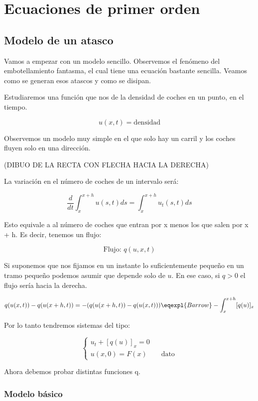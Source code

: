 \chapter{Ecuaciones de primer orden}

\section{Modelo de un atasco}

	Vamos a empezar con un modelo sencillo. Observemos el fenómeno del embotellamiento fantasma, el cual tiene una ecuación bastante sencilla. Veamos como se generan esos atascos y como se disipan.

	Estudiaremos una función que nos de la densidad de coches en un punto, en el tiempo.

	$$u(x,t) = \text{densidad}$$

	Observemos un modelo muy simple en el que solo hay un carril y los coches fluyen solo en una dirección.

	(DIBUO DE LA RECTA CON FLECHA HACIA LA DERECHA)

	La variación en el número de coches de un intervalo será:

	$$ \frac{d}{dt} \int^{x+h}_{x} u(s,t) ds = \int^{x+h}_{x} u_t(s,t) ds $$

	Esto equivale a al número de coches que entran por x menos los que salen por x + h. Es decir, tenemos un flujo:

	$$\text{Flujo: } q(u, x, t)$$

	Si suponemos que nos fijamos en un instante lo suficientemente pequeño en un tramo pequeño podemos asumir que depende solo de $u$. En ese caso, si $q > 0$ el flujo sería hacia la derecha.

	$$ q(u(x,t)) - q(u(x+h,t)) = -( q(u(x+h,t)) -  q(u(x,t)) ) \eqexpl{Barrow} -\int^{x+h}_{x} [q(u)]_{x} $$

	Por lo tanto tendremos sistemas del tipo:

	\begin{equation*}
	\left\{
	\begin{array}{l}
	u_t + [q(u)]_{x} = 0 \\
	u(x, 0) = F(x) \quad \quad \text{dato}
	\end{array}
	\right.
	\end{equation*}

	Ahora debemos probar distintas funciones q.


	\subsection{Modelo básico}

